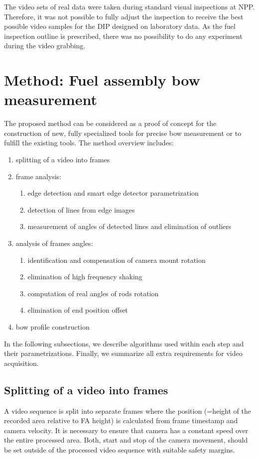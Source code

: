\documentclass[preprint,12pt]{elsarticle}
\begin{document}
The video sets of real data were taken during standard visual inspections at \ac{NPP}. Therefore, it was not possible to fully adjust the inspection to receive the best possible video samples for the \ac{DIP} designed on laboratory data. As the fuel inspection outline is prescribed, there was no possibility to do any experiment during the video grabbing.

\section{Method: Fuel assembly bow measurement}

The proposed method can be considered as a proof of concept for the construction of new, fully specialized tools for precise bow measurement or to fulfill the existing tools. The method overview includes:
\begin{enumerate}
    \item splitting of a video into frames
    \item frame analysis:
    \begin{enumerate}
        \item edge detection and smart edge detector parametrization
        \item detection of lines from edge images
        \item measurement of angles of detected lines and elimination of outliers
    \end{enumerate}
    \item analysis of frames angles:
    \begin{enumerate}
        \item identification and compensation of camera mount rotation
        \item elimination of high frequency shaking
        \item computation of real angles of rods rotation
        \item elimination of end position offset
    \end{enumerate}
    \item bow profile construction
\end{enumerate}

In the following subsections, we describe algorithms used within each step and their parametrizations. Finally, we summarize all extra requirements for video acquisition.

\subsection{Splitting of a video into frames}
A video sequence is split into separate frames where the position (=height of the recorded area relative to \ac{FA} height) is calculated from frame timestamp and camera velocity. It is necessary to ensure that camera has a constant speed over the entire processed area. Both, start and stop of the camera movement, should be set outside of the processed video sequence with suitable safety margins. 
\end{document}
